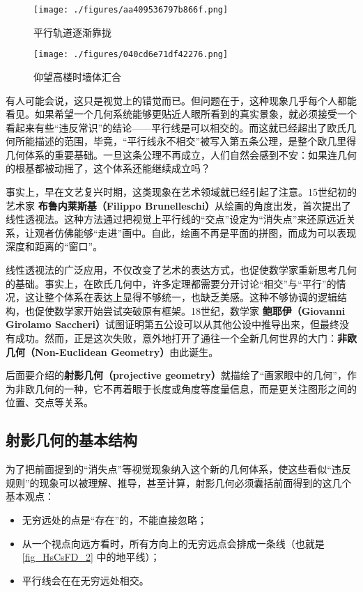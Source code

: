 \begin{figure}[ht]
\centering
\texttt{[image: ./figures/aa409536797b866f.png]}
\caption{平行轨道逐渐靠拢} \label{fig_HsCsFD_2}
\end{figure}

\begin{figure}[ht]
\centering
\texttt{[image: ./figures/040cd6e71df42276.png]}
\caption{仰望高楼时墙体汇合} \label{fig_HsCsFD_3}
\end{figure}

有人可能会说，这只是视觉上的错觉而已。但问题在于，这种现象几乎每个人都能看见。如果希望一个几何系统能够更贴近人眼所看到的真实景象，就必须接受一个看起来有些“违反常识”的结论——平行线是可以相交的。而这就已经超出了欧氏几何所能描述的范围，毕竟，“平行线永不相交”被写入第五条公理，是整个欧几里得几何体系的重要基础。一旦这条公理不再成立，人们自然会感到不安：如果连几何的根基都被动摇了，这个体系还能继续成立吗？

事实上，早在文艺复兴时期，这类现象在艺术领域就已经引起了注意。15世纪初的艺术家 \textbf{布鲁内莱斯基（Filippo Brunelleschi）}从绘画的角度出发，首次提出了线性透视法。这种方法通过把视觉上平行线的“交点”设定为“消失点”来还原远近关系，让观者仿佛能够“走进”画中。自此，绘画不再是平面的拼图，而成为可以表现深度和距离的“窗口”。

线性透视法的广泛应用，不仅改变了艺术的表达方式，也促使数学家重新思考几何的基础。事实上，在欧氏几何中，许多定理都需要分开讨论“相交”与“平行”的情况，这让整个体系在表达上显得不够统一，也缺乏美感。这种不够协调的逻辑结构，也促使数学家开始尝试突破原有框架。18世纪，数学家 \textbf{鲍耶伊（Giovanni Girolamo Saccheri）}试图证明第五公设可以从其他公设中推导出来，但最终没有成功。然而，正是这次失败，意外地打开了通往一个全新几何世界的大门：\textbf{非欧几何（Non-Euclidean Geometry）}由此诞生。

后面要介绍的\textbf{射影几何（projective geometry）}就描绘了“画家眼中的几何”，作为非欧几何的一种，它不再着眼于长度或角度等度量信息，而是更关注图形之间的位置、交点等关系。

\subsection{射影几何的基本结构}

为了把前面提到的“消失点”等视觉现象纳入这个新的几何体系，使这些看似“违反规则”的现象可以被理解、推导，甚至计算，射影几何必须囊括前面得到的这几个基本观点：
\begin{itemize}
\item 无穷远处的点是“存在”的，不能直接忽略；
\item 从一个视点向远方看时，所有方向上的无穷远点会排成一条线（也就是\autoref{fig_HsCsFD_2} 中的地平线）；
\item 平行线会在在无穷远处相交。
\end{itemize}

